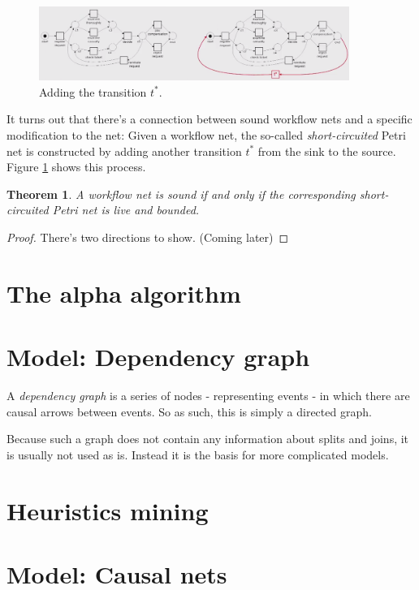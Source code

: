 \documentclass[12pt, a4paper]{article}
\newtheorem{theorem}{Theorem}[section]
\numberwithin{equation}{section}
\begin{document}
\begin{figure}
\centering
\includegraphics[width=0.9\textwidth]{wf_theorem}
\caption{Adding the transition $t^*$.}
\label{fig:wf_theorem}
\end{figure}

It turns out that there's a connection between sound workflow nets and a specific modification to the net: Given a workflow net, the so-called \textit{short-circuited} Petri net is constructed by adding another transition $t^*$ from the sink to the source. Figure \ref{fig:wf_theorem} shows this process.

\begin{theorem}
A workflow net is sound if and only if the corresponding short-circuited Petri net is live and bounded.
\end{theorem}
\begin{proof}
There's two directions to show. (Coming later)
\end{proof}

\section{The alpha algorithm}

\section{Model: Dependency graph}
A \textit{dependency graph} is a series of nodes - representing events - in which there are causal arrows between events. So as such, this is simply a directed graph.

Because such a graph does not contain any information about splits and joins, it is usually not used as is. Instead it is the basis for more complicated models.

\section{Heuristics mining}



\section{Model: Causal nets}
\end{document}

